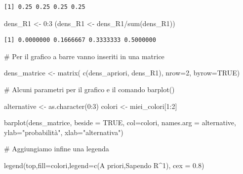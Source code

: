 \documentclass[
  italian,
  letterpaper,
]{book}
\newenvironment{Shaded}{\begin{snugshade}}{\end{snugshade}}
\newcommand{\AttributeTok}[1]{\textcolor[rgb]{0.40,0.45,0.13}{#1}}
\newcommand{\CommentTok}[1]{\textcolor[rgb]{0.37,0.37,0.37}{#1}}
\newcommand{\ConstantTok}[1]{\textcolor[rgb]{0.56,0.35,0.01}{#1}}
\newcommand{\DecValTok}[1]{\textcolor[rgb]{0.68,0.00,0.00}{#1}}
\newcommand{\FloatTok}[1]{\textcolor[rgb]{0.68,0.00,0.00}{#1}}
\newcommand{\FunctionTok}[1]{\textcolor[rgb]{0.28,0.35,0.67}{#1}}
\newcommand{\NormalTok}[1]{\textcolor[rgb]{0.00,0.23,0.31}{#1}}
\newcommand{\OtherTok}[1]{\textcolor[rgb]{0.00,0.23,0.31}{#1}}
\newcommand{\SpecialCharTok}[1]{\textcolor[rgb]{0.37,0.37,0.37}{#1}}
\newcommand{\StringTok}[1]{\textcolor[rgb]{0.13,0.47,0.30}{#1}}
\theoremstyle{definition}
\theoremstyle{remark}
\begin{document}
\begin{verbatim}
[1] 0.25 0.25 0.25 0.25
\end{verbatim}

\begin{Shaded}
\begin{Highlighting}[]
\NormalTok{dens\_R1 }\OtherTok{\textless{}{-}} \DecValTok{0}\SpecialCharTok{:}\DecValTok{3}
\NormalTok{(dens\_R1 }\OtherTok{\textless{}{-}}\NormalTok{ dens\_R1}\SpecialCharTok{/}\FunctionTok{sum}\NormalTok{(dens\_R1))}
\end{Highlighting}
\end{Shaded}

\begin{verbatim}
[1] 0.0000000 0.1666667 0.3333333 0.5000000
\end{verbatim}

\begin{Shaded}
\begin{Highlighting}[]
\CommentTok{\# Per il grafico a barre vanno inseriti in una matrice}

\NormalTok{dens\_matrice }\OtherTok{\textless{}{-}} \FunctionTok{matrix}\NormalTok{( }\FunctionTok{c}\NormalTok{(dens\_apriori, dens\_R1), }\AttributeTok{nrow=}\DecValTok{2}\NormalTok{, }\AttributeTok{byrow=}\ConstantTok{TRUE}\NormalTok{)}

\CommentTok{\# Alcuni parametri per il grafico e il comando barplot()}

\NormalTok{alternative }\OtherTok{\textless{}{-}} \FunctionTok{as.character}\NormalTok{(}\DecValTok{0}\SpecialCharTok{:}\DecValTok{3}\NormalTok{)}
\NormalTok{colori }\OtherTok{\textless{}{-}}\NormalTok{ miei\_colori[}\DecValTok{1}\SpecialCharTok{:}\DecValTok{2}\NormalTok{]}

\FunctionTok{barplot}\NormalTok{(dens\_matrice, }\AttributeTok{beside =} \ConstantTok{TRUE}\NormalTok{, }\AttributeTok{col=}\NormalTok{colori, }\AttributeTok{names.arg =}\NormalTok{ alternative, }\AttributeTok{ylab=}\StringTok{"probabilità"}\NormalTok{, }\AttributeTok{xlab=}\StringTok{"alternativa"}\NormalTok{)}

\CommentTok{\# Aggiungiamo infine una legenda}

\FunctionTok{legend}\NormalTok{(}\StringTok{\textquotesingle{}top\textquotesingle{}}\NormalTok{,}\AttributeTok{fill=}\NormalTok{colori,}\AttributeTok{legend=}\FunctionTok{c}\NormalTok{(}\StringTok{\textquotesingle{}A priori\textquotesingle{}}\NormalTok{,}\StringTok{\textquotesingle{}Sapendo R\^{}1\textquotesingle{}}\NormalTok{), }\AttributeTok{cex =} \FloatTok{0.8}\NormalTok{)}
\end{Highlighting}
\end{Shaded}
\end{document}
